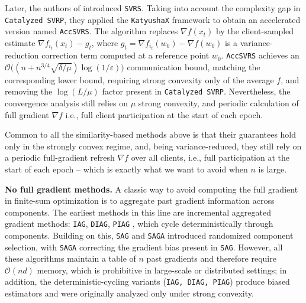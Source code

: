 \documentclass{article}
\begin{document}


Later, the authors of \cite{lin2023stochastic} introduced \texttt{SVRS}. Taking into account 
the complexity gap in \texttt{Catalyzed SVRP}, they applied the \texttt{KatyushaX} 
framework to obtain an accelerated version named \texttt{AccSVRS}. The 
algorithm replaces $\nabla f(x_t)$ by the client-sampled estimate 
$\nabla f_{i_t}(x_t) - g_t$, where $g_t = \nabla f_{i_t}(w_0) - \nabla f(w_0)$ 
is a variance-reduction correction term computed at a reference point $w_0$.
\texttt{AccSVRS} achieves an $\mathcal{O}\bigl((n + n^{3/4}\sqrt{\delta/\mu})\log(1/\varepsilon)\bigr)$ 
communication bound, matching the corresponding lower bound, requiring 
strong convexity only of the average $f$, and removing the $\log(L/\mu)$ 
factor present in \texttt{Catalyzed SVRP}. Nevertheless, the convergence analysis still relies on $\mu$ strong convexity, and periodic calculation of full gradient $\nabla f$ i.e., full client participation at the start of each epoch.  

Common to all the similarity-based methods above is that their guarantees hold only in the strongly convex regime, and, being variance-reduced, they still rely on a periodic full-gradient refresh $\nabla f$ over all clients, i.e., full participation at the start of each epoch -- which is exactly what we want to avoid when $n$ is large.

\textbf{No full gradient methods.} 
A classic way to avoid computing the full gradient in finite-sum optimization 
is to aggregate past gradient information across components. The earliest 
methods in this line are incremental aggregated gradient methods: \texttt{IAG}, 
\texttt{DIAG}, \texttt{PIAG} \cite{gurbuzbalaban2017convergence, 
mokhtari2018surpassing, vanli2018global}, which cycle deterministically through 
components. Building on this, \texttt{SAG} \cite{roux2012stochastic} and 
\texttt{SAGA} \cite{defazio2014saga} introduced randomized component selection, 
with \texttt{SAGA} correcting the gradient bias present in \texttt{SAG}. 
However, all these algorithms maintain a table of $n$ past gradients and 
therefore require $\mathcal{O}(nd)$ memory, which is prohibitive in large-scale 
or distributed settings; in addition, the deterministic-cycling variants 
(\texttt{IAG, DIAG, PIAG}) produce biased estimators and were originally 
analyzed only under strong convexity.
\end{document}
